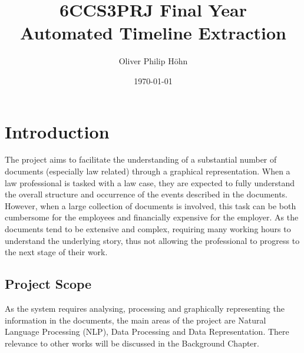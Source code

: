 \documentclass[11pt]{informatics-report}
\title{6CCS3PRJ Final Year\\\vspace{0.2cm}Automated Timeline Extraction}
\author{Oliver Philip H\"ohn}
\date{\today}
\begin{document}
\createFrontMatter
\onehalfspacing
\tableofcontents
\doublespacing


\chapter{Introduction}
\par The project aims to facilitate the understanding of a substantial number of documents (especially law related) through a graphical representation. When a law professional is tasked with a law case, they are expected to fully understand the overall structure and occurrence of the events described in the documents. However, when a large collection of documents is involved, this task can be both cumbersome for the employees and  financially expensive for the employer. As the documents tend to be extensive and complex, requiring many working hours to understand the underlying story, thus not allowing the professional to progress to the next stage of their work.
\section{Project Scope}
\par As the system requires analysing, processing and graphically representing the information in the documents, the main areas of the project are Natural Language Processing (NLP), Data Processing and Data Representation. There relevance to other works will be discussed in the Background Chapter.
\end{document}
